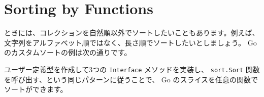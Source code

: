 \section{Sorting by Functions}

ときには、コレクションを自然順以外でソートしたいこともあります。例えば、文字列をアルファベット順ではなく、長さ順でソートしたいとしましょう。 Go のカスタムソートの例は次の通りです。




ユーザー定義型を作成して3つの \texttt{Interface} メソッドを実装し、 \texttt{sort.Sort} 関数を呼び出す、という同じパターンに従うことで、 Go のスライスを任意の関数でソートができます。